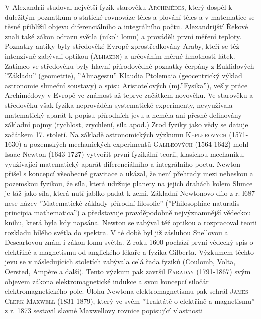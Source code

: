     V Alexandrii studoval největší fyzik starověku \textsc{Archimédes}, který dospěl k důležitým
    poznatkům o statické rovnováze těles a plování těles a v matematice se těsně přiblížil objevu
    diferenciálního a integrálního počtu. Alexandrijští Řekové znali také zákon odrazu světla
    (nikoli lomu) a prováděli první měření teploty. Poznatky antiky byly středověké Evropě
    zprostředkovány Araby, kteří se též intenzivně zabývali optikou (\textsc{Alhazen}) a určováním
    měrné hmotnosti látek. Zatímco ve středověku byly hlavní přírodovědné poznatky čerpány z
    Euklidových ”Základu” (geometrie), ”Almagestu” Klaudia Ptolemaia (geocentrický výklad astronomie
    sluneční soustavy) a spisu Aristotelových (mj.”Fysika”), vešly práce Archimédovy v Evropě ve
    známost až teprve začátkem novověku. Ve starověku a středověku však fyzika neprováděla
    systematické experimenty, nevyužívala matematický aparát k popisu přírodních jevu a neměla ani
    přesně definovány základní pojmy (rychlost, zrychlení, síla apod.) Zrod fyziky jako vědy se
    datuje začátkem 17. století. Na základě astronomických výzkumu \textsc{Keplerových} (1571-1630)
    a pozemských mechanických experimentů\textsc{ Galileových} (1564-1642) mohl Isaac Newton
    (1643-1727) vytvořit první fyzikální teorii, klasickou mechaniku, využívající matematický aparát
    diferenciálního a integrálního poctu. Newton přišel s koncepcí všeobecné gravitace a ukázal, že
    není přehrady mezi nebeskou a pozemskou fyzikou, že síla, která udržuje planety na jejich
    drahách kolem Slunce je táž jako síla, která nutí jablko padat k zemi. Základní Newtonovo dílo z
    r. l687 nese název ”Matematické základy přírodní filosofie” (”Philosophiae naturalis principia
    mathematica”) a představuje pravděpodobně nejvýznamnější vědeckou knihu, která byla kdy napsána.
    Newton se zabýval též optikou a rozpracoval teorii rozkladu bílého světla do spektra. V té době
    byl již zásluhou Snellovou a Descartovou znám i zákon lomu světla. Z roku 1600 pochází první
    vědecký spis o elektřině a magnetismu od anglického lékaře a fyzika Gilberta. Výzkumem  těchto
    jevu se v následujících stoletích zabývala celá řada fyziků (Coulomb, Volta, Oersted, Amp\`{e}re
    a další). Tento výzkum pak završil \textsc{Faraday} (1791-1867) svým objevem zákona
    elektromagnetické indukce a svou koncepcí siločár elektromagnetického pole. Úlohu Newtona
    elektromagnetismu pak sehrál \textsc{James Clerk Maxwell} (1831-1879), který ve svém ”Traktátě o
    elektřině a magnetismu” z r. 1873 sestavil slavné Maxwellovy rovnice popisující vlastnosti
